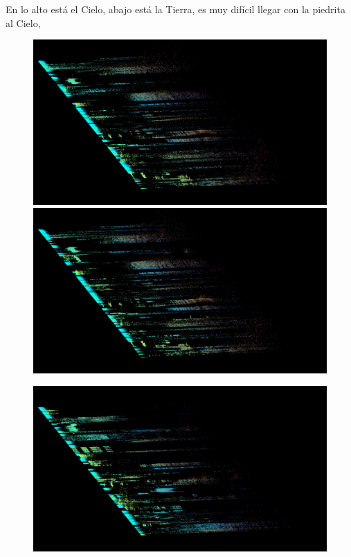 \documentclass{article}
\begin{document}
\begin{center}

En lo alto est\'{a} el Cielo, abajo est\'{a} la Tierra, es muy dif\'{i}cil llegar con la piedrita al Cielo, 

\end{center}

\begin{figure}
\begin{multicols}{2}
    \includegraphics[width=\linewidth]{preset-50-9.jpg}%
    \includegraphics[width=\linewidth]{preset-50-10.jpg}%
    \end{multicols}
\begin{multicols}{2}
    \includegraphics[width=\linewidth]{preset-50-1.jpg}%

\end{multicols}
\end{figure}
\end{document}
